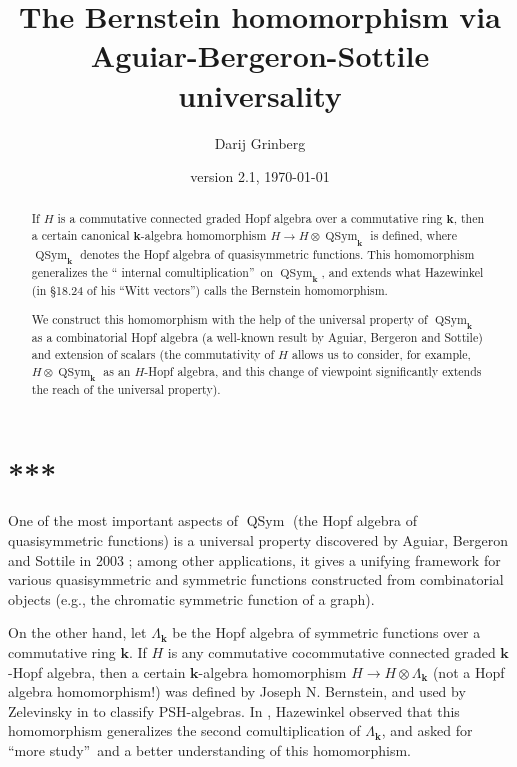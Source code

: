 \documentclass
[numbers=enddot,12pt,final,onecolumn,notitlepage,abstracton]{scrartcl}%
\theoremstyle{definition}
\begin{document}
\title{The Bernstein homomorphism via Aguiar-Bergeron-Sottile universality}
\author{Darij Grinberg}
\date{version 2.1, {\today}}
\maketitle

\begin{abstract}
If $H$ is a commutative connected graded Hopf algebra over a commutative ring
$\mathbf{k}$, then a certain canonical $\mathbf{k}$-algebra homomorphism
$H\rightarrow H\otimes\operatorname*{QSym}\nolimits_{\mathbf{k}}$ is defined,
where $\operatorname*{QSym}\nolimits_{\mathbf{k}}$ denotes the Hopf algebra of
quasisymmetric functions. This homomorphism generalizes the \textquotedblleft
internal comultiplication\textquotedblright\ on $\operatorname*{QSym}%
\nolimits_{\mathbf{k}}$, and extends what Hazewinkel (in \S 18.24 of his
\textquotedblleft Witt vectors\textquotedblright) calls the Bernstein homomorphism.

We construct this homomorphism with the help of the universal property of
$\operatorname*{QSym}\nolimits_{\mathbf{k}}$ as a combinatorial Hopf algebra
(a well-known result by Aguiar, Bergeron and Sottile) and extension of scalars
(the commutativity of $H$ allows us to consider, for example, $H\otimes
\operatorname*{QSym}\nolimits_{\mathbf{k}}$ as an $H$-Hopf algebra, and this
change of viewpoint significantly extends the reach of the universal property).

\end{abstract}
\tableofcontents

\section*{***}

One of the most important aspects of $\operatorname*{QSym}$ (the Hopf algebra
of quasisymmetric functions) is a universal property discovered by Aguiar,
Bergeron and Sottile in 2003 \cite{ABS}; among other applications, it gives a
unifying framework for various quasisymmetric and symmetric functions
constructed from combinatorial objects (e.g., the chromatic symmetric function
of a graph).

On the other hand, let $\Lambda_{\mathbf{k}}$ be the Hopf algebra of symmetric
functions over a commutative ring $\mathbf{k}$. If $H$ is any commutative
cocommutative connected graded $\mathbf{k}$-Hopf algebra, then a certain
$\mathbf{k}$-algebra homomorphism $H\rightarrow H\otimes\Lambda_{\mathbf{k}}$
(not a Hopf algebra homomorphism!) was defined by Joseph N. Bernstein, and
used by Zelevinsky in \cite[\S 5.2]{Zelevi81} to classify PSH-algebras. In
\cite[\S 18.24]{HazeWitt}, Hazewinkel observed that this homomorphism
generalizes the second comultiplication of $\Lambda_{\mathbf{k}}$, and asked
for \textquotedblleft more study\textquotedblright\ and a better understanding
of this homomorphism.
\end{document}
